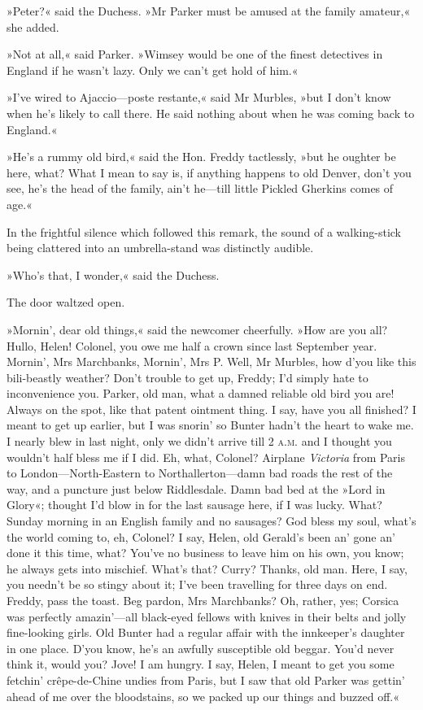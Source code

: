 »Peter?« said the Duchess. »Mr Parker must be amused at the family amateur,« she added.

»Not at all,« said Parker. »Wimsey would be one of the finest detectives in England if he wasn't lazy. Only we can't get hold of him.«

»I've wired to Ajaccio\allowbreak---\allowbreak poste restante,« said Mr Murbles, »but I don't know when he's likely to call there. He said nothing about when he was coming back to England.«

»He's a rummy old bird,« said the Hon. Freddy tactlessly, »but he oughter be here, what? What I mean to say is, if anything happens to old Denver, don't you see, he's the head of the family, ain't he\allowbreak---\allowbreak till little Pickled Gherkins comes of age.«

In the frightful silence which followed this remark, the sound of a walking-stick being clattered into an umbrella-stand was distinctly
audible.

»Who's that, I wonder,« said the Duchess.

The door waltzed open.

»Mornin', dear old things,« said the newcomer cheerfully. »How are you all? Hullo, Helen! Colonel, you owe me half a crown since last September year. Mornin', Mrs Marchbanks, Mornin', Mrs P. Well, Mr  Murbles, how d'you like this bili-beastly weather? Don't trouble to get up, Freddy; I'd simply hate to inconvenience you. Parker, old man, what a damned reliable old bird you are! Always on the spot, like that patent ointment thing. I say, have you all finished? I meant to get up earlier, but I was snorin' so Bunter hadn't the heart to wake me. I nearly blew in last night, only we didn't arrive till 2 \textsc{a.m.} and I thought you wouldn't half bless me if I did. Eh, what, Colonel? Airplane \textit{Victoria} from Paris to London\allowbreak---\allowbreak North-Eastern to Northallerton\allowbreak---\allowbreak damn bad roads the rest of the way, and a puncture just below Riddlesdale. Damn bad bed at the »Lord in Glory«; thought I'd blow in for the last sausage here, if I was lucky. What? Sunday morning in an English family and no sausages? God bless my soul, what's the world coming to, eh, Colonel? I say, Helen, old Gerald's been an' gone an' done it this time, what? You've no business to leave him on his own, you know; he always gets into mischief. What's that? Curry? Thanks, old man. Here, I say, you needn't be so stingy about it; I've been travelling for three days on end. Freddy, pass the toast. Beg pardon, Mrs Marchbanks? Oh, rather, yes; Corsica was perfectly amazin'---all black-eyed fellows with knives in their belts and jolly fine-looking girls. Old Bunter had a regular affair with the innkeeper's daughter in one place. D'you know, he's an awfully susceptible old beggar. You'd never think it, would you? Jove! I am hungry. I say, Helen, I meant to get you some fetchin' crêpe-de-Chine undies from Paris, but I saw that old Parker was gettin' ahead of me over the bloodstains, so we packed up our things and buzzed off.«

